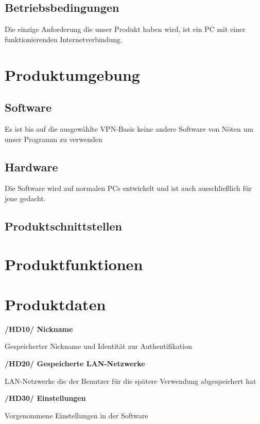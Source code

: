 \documentclass[a4paper,12pt]{scrreprt}
\begin{document}
	
		
		
	\section{Betriebsbedingungen}
	Die einzige Anforderung die unser Produkt haben wird, ist ein PC mit einer funktionierenden Internetverbindung. 	
		
\chapter{Produktumgebung}
	
	\section{Software}
		
		Es ist bis auf die ausgewählte VPN-Basis keine andere Software von Nöten um unser Programm zu verwenden
		
	\section{Hardware}
		
	Die Software wird auf normalen PCs entwickelt und ist auch ausschließlich für jene gedacht. 
		
		
	\section{Produktschnittstellen}
		
		
		
\chapter{Produktfunktionen}
	
	
		
\chapter{Produktdaten}
	
	\textbf{/HD10/ Nickname}	
	
	Gespeicherter Nickname und Identität zur Authentifikation
	
	\textbf{/HD20/ Gespeicherte LAN-Netzwerke}
	
	LAN-Netzwerke die der Benutzer für die spätere Verwendung abgespeichert hat
	
	\textbf{/HD30/ Einstellungen}
	
	Vorgenommene Einstellungen in der Software
	
\end{document}
